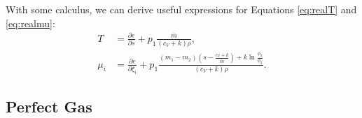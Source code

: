 With some calculus, we can derive useful expressions for Equations \ref{eq:realT} and \ref{eq:realmu}:
\begin{subequations}
	\begin{align}
		T&=\frac{\partial e}{\partial s}+p_{1}\frac{\overline{m}}{\left(c_{V}+k\right)\rho},\\
		\mu_{i}&=\frac{\partial e}{\partial \xi_{i}}+p_{1}\frac{\left(m_{1}-m_{2}\right)\left(s-\frac{c_{V}+k}{\overline{m}}\right)+k\ln{\frac{\phi_{2}}{\phi_{2}}}}{\left(c_{V}+k\right)\rho}.
	\end{align}
\end{subequations}


\subsection{Perfect Gas} %
\label{sub:perfect}

